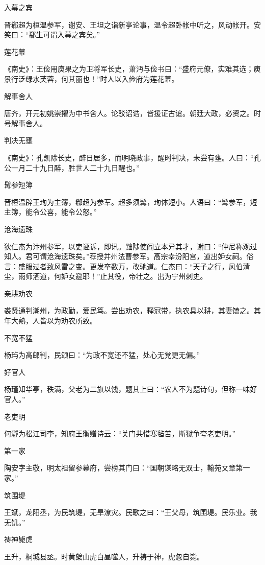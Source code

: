 \documentclass[a4paper,12pt,UTF8,twoside]{ctexbook}
\begin{document}
    入幕之宾
    
    晋郗超为桓温参军，谢安、王坦之诣新亭论事，温令超卧帐中听之，风动帐开。安笑曰：“郗生可谓入幕之宾矣。”
    
    莲花幕
    
    《南史》：王俭用庾果之为卫将军长史，萧沔与俭书曰：“盛府元僚，实难其选；庾景行泛绿水芙蓉，何其丽也！”时人以入俭府为莲花幕。
    
    解事舍人
    
    唐齐，开元初姚崇擢为中书舍人。论驳诏诰，皆援证古谊。朝廷大政，必资之。时号解事舍人。
    
    判决无壅
    
    《南史》：孔凯除长史，醉日居多，而明晓政事，醒时判决，未尝有壅。人曰：“孔公一月二十九日醉，胜世人二十九日醒也。”
    
    髯参短簿
    
    晋桓温辟王珣为主簿，郗超为参军。超多须髯，珣体短小。人语曰：“髯参军，短主簿，能令公喜，能令公怒。”
    
    沧海遗珠
    
    狄仁杰为汴州参军，以吏诬诉，即讯。黜陟使阎立本异其才，谢曰：“仲尼称观过知人。君可谓沧海遗珠矣。”荐授并州法曹参军。高宗幸汾阳宫，道出妒女祠。俗言：盛服过者致风雷之变。更发卒数万，改驰道。仁杰曰：“天子之行，风伯清尘，雨师洒道，何妒女避耶！”止其役，帝壮之。出为宁州刺史。
    
    亲耕劝农
    
    裘贤通判潮州，为政勤，爱民笃。尝出劝农，释冠带，执农具以耕，其妻馌之。其年大熟，人皆以为劝农所致。
    
    不宽不猛
    
    杨玙为高邮判，民颂曰：“为政不宽还不猛，处心无党更无偏。”
    
    好官人
    
    杨瑾知华亭，秩满，父老为二旗以饯，题其上曰：“农人不为题诗句，但称一味好官人。”
    
    老吏明
    
    何瀞为松江司李，知府王衡赠诗云：“关门共惜寒毡苦，断狱争夸老吏明。”
    
    第一家
    
    陶安字主敬，明太祖留参幕府，尝榜其门曰：“国朝谋略无双士，翰苑文章第一家。”
    
    筑围堤
    
    王斌，龙阳丞，为民筑堤，无旱潦灾。民歌之曰：“王父母，筑围堤。民乐业。我无饥。”
    
    祷神毙虎
    
    王升，桐城县丞。时黄櫱山虎白昼噬人，升祷于神，虎忽自毙。
    
\end{document}
